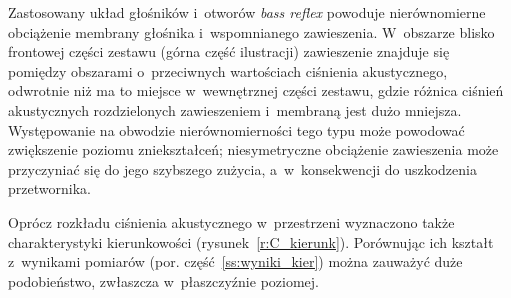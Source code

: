 \documentclass[12pt]{oska}
\begin{document}
	Zastosowany układ głośników i~otworów \textit{bass reflex} powoduje nierównomierne obciążenie membrany głośnika i~wspomnianego zawieszenia. W~obszarze blisko frontowej części zestawu (górna część ilustracji) zawieszenie znajduje się pomiędzy obszarami o~przeciwnych wartościach ciśnienia akustycznego, odwrotnie niż ma to miejsce w~wewnętrznej części zestawu, gdzie różnica ciśnień akustycznych rozdzielonych zawieszeniem i~membraną jest dużo mniejsza. Występowanie na obwodzie nierównomierności tego typu może powodować zwiększenie poziomu zniekształceń; niesymetryczne obciążenie zawieszenia może przyczyniać się do jego szybszego zużycia, a~w~konsekwencji do uszkodzenia przetwornika.  
	
	Oprócz rozkładu ciśnienia akustycznego w~przestrzeni wyznaczono także charakterystyki kierunkowości (rysunek~\ref{r:C_kierunk}). Porównując ich kształt z~wynikami pomiarów (por. część~\ref{ss:wyniki_kier}) można zauważyć duże podobieństwo, zwłaszcza w~płaszczyźnie poziomej.
	
\end{document}
